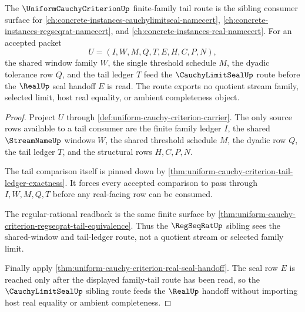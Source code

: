 \begin{theorem}
\label{thm:uniform-cauchy-criterion-cauchy-limit-seal-sibling-route}
The $\UniformCauchyCriterionUp$ finite-family tail route is the sibling consumer surface for \autoref{ch:concrete-instances-cauchylimitseal-namecert}, \autoref{ch:concrete-instances-regseqrat-namecert}, and \autoref{ch:concrete-instances-real-namecert}. For an accepted packet
$$
U=(I,W,M,Q,T,E,H,C,P,N),
$$
the shared window family $W$, the single threshold schedule $M$, the dyadic tolerance row $Q$, and the tail ledger $T$ feed the $\CauchyLimitSealUp$ route before the $\RealUp$ seal handoff $E$ is read. The route exports no quotient stream family, selected limit, host real equality, or ambient completeness object.
\end{theorem}
\begin{proof}
Project $U$ through \autoref{def:uniform-cauchy-criterion-carrier}. The only source rows available to a tail consumer are the finite family ledger $I$, the shared $\StreamNameUp$ windows $W$, the shared threshold schedule $M$, the dyadic row $Q$, the tail ledger $T$, and the structural rows $H,C,P,N$.

The tail comparison itself is pinned down by \autoref{thm:uniform-cauchy-criterion-tail-ledger-exactness}. It forces every accepted comparison to pass through $I,W,M,Q,T$ before any real-facing row can be consumed.

The regular-rational readback is the same finite surface by \autoref{thm:uniform-cauchy-criterion-regseqrat-tail-equivalence}. Thus the $\RegSeqRatUp$ sibling sees the shared-window and tail-ledger route, not a quotient stream or selected family limit.

Finally apply \autoref{thm:uniform-cauchy-criterion-real-seal-handoff}. The seal row $E$ is reached only after the displayed family-tail route has been read, so the $\CauchyLimitSealUp$ sibling route feeds the $\RealUp$ handoff without importing host real equality or ambient completeness.
\end{proof}
